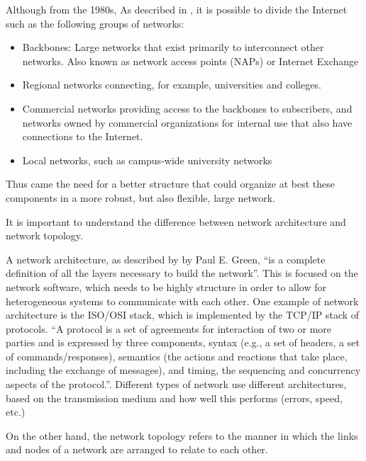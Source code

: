 	Although from the 1980s, As described in \cite{gg243376}, it is possible to divide the Internet such as the following groups of networks:
	\begin{itemize}[noitemsep]
		\item Backbones: Large networks that exist primarily to interconnect other networks. Also known as network access points (NAPs) or Internet Exchange
		\item Regional networks connecting, for example, universities and colleges.
		\item Commercial networks providing access to the backbones to subscribers, and networks owned by commercial organizations for internal use that also have connections to the Internet.
		\item Local networks, such as campus-wide university networks
	\end{itemize}

	Thus came the need for a better structure that could organize at best these components in a more robust, but also flexible, large network.
	
	
	
	It is important to understand the difference between network architecture and network topology.
	
	A network architecture, as described by by Paul E. Green, ``is a complete definition of all the layers necessary to build the network''\cite{nla.cat-vn252493}.
	This is focused on the network software, which needs to be highly structure in order to allow for heterogeneous systems to communicate with each other.
	One example of network architecture is the ISO/OSI stack, which is implemented by the TCP/IP stack of protocols.
	``A protocol is a set of agreements for interaction of two or more parties and is expressed by three components, syntax (e.g., a set of headers, a set of commands/responses), semantics (the actions and reactions that take place, including the exchange of messages), and timing, the sequencing and concurrency aspects of the protocol.''\cite{nla.cat-vn252493}.
	Different types of network use different architectures, based on the transmission medium and how well this performs (errors, speed, etc.)
	
	On the other hand, the network topology refers to the manner in which the links and nodes of a network are arranged to relate to each other.
	
